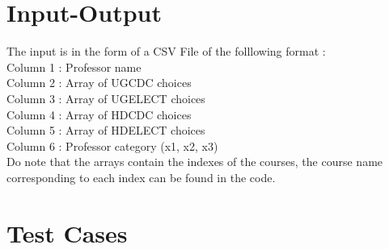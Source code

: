 \documentclass{article}
\begin{document}
\section{Input-Output}
The input is in the form of a CSV File of the folllowing format : \\
    Column 1 : Professor name \\
    Column 2 : Array of UGCDC choices \\
    Column 3 : Array of UGELECT choices \\
    Column 4 : Array of HDCDC choices\\
    Column 5 : Array of HDELECT choices \\
    Column 6 : Professor category (x1, x2, x3) \\
    
Do note that the arrays contain the indexes of the courses, the course name corresponding to each index can be found in the code.

    
\newpage
{}
\section{Test Cases}
\end{document}

